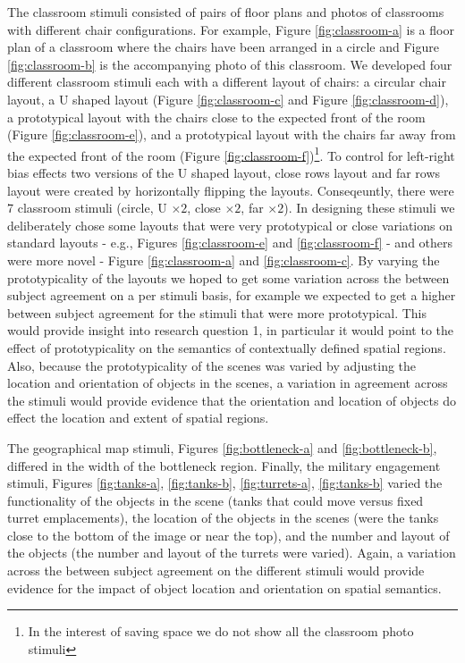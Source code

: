 \documentclass[11pt,letterpaper]{article}
\begin{document}
The classroom stimuli consisted of pairs of floor plans and photos of classrooms with different chair configurations. For example, Figure \ref{fig:classroom-a} is a floor plan of a classroom where the chairs have been arranged in a circle and Figure \ref{fig:classroom-b} is the accompanying photo of this classroom. We developed four different classroom stimuli each with a different layout of chairs: a circular chair layout, a U shaped layout (Figure \ref{fig:classroom-c} and Figure \ref{fig:classroom-d}), a prototypical layout with the chairs close to the expected front of the room (Figure \ref{fig:classroom-e}), and a prototypical layout with the chairs far away from the expected front of the room (Figure \ref{fig:classroom-f})\footnote{In the interest of saving space we do not show all the classroom photo stimuli}. To control for left-right bias effects two versions of the U shaped layout, close rows layout and far rows layout were created by horizontally flipping the layouts. Conseqeuntly, there were 7 classroom stimuli (circle, U $\times 2$, close $\times 2$, far $\times 2$). In designing these stimuli we deliberately chose some layouts that were very prototypical or close variations on standard layouts - e.g., Figures \ref{fig:classroom-e} and \ref{fig:classroom-f} - and others were more novel - Figure \ref{fig:classroom-a} and \ref{fig:classroom-c}. By varying the prototypicality of the layouts we hoped to get some variation across the between subject agreement on a per stimuli basis, for example we expected to get a higher between subject agreement for the stimuli that were more prototypical. This would provide insight into research question 1, in particular it would point to the effect of prototypicality on the semantics of contextually defined spatial regions. Also, because the prototypicality of the scenes was varied by adjusting the location and orientation of objects in the scenes, a variation in agreement across the stimuli would provide evidence that the orientation and location of objects do effect the location and extent of spatial regions.

The geographical map stimuli, Figures \ref{fig:bottleneck-a} and \ref{fig:bottleneck-b}, differed in the width of the bottleneck region. Finally, the military engagement stimuli, Figures \ref{fig:tanks-a}, \ref{fig:tanks-b}, \ref{fig:turrets-a}, \ref{fig:tanks-b} varied the functionality of the objects in the scene (tanks that could move versus fixed turret emplacements), the location of the objects in the scenes (were the tanks close to the bottom of the image or near the top), and the number and layout of the objects (the number and layout of the turrets were varied). Again, a variation across the between subject agreement on the different stimuli would provide evidence for the impact of object location and orientation on spatial semantics.
\end{document}
